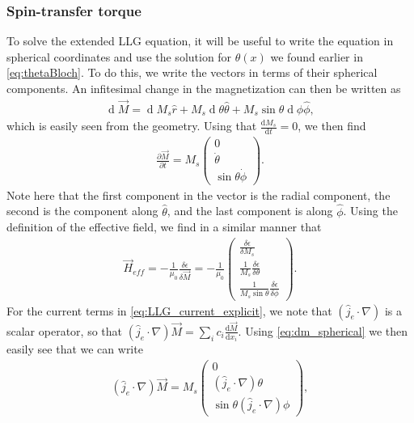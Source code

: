 \documentclass[12pt, a4paper, twoside, openright]{article}		%
\renewcommand{\d}[1]{\ensuremath{\operatorname{d}\!{#1}}}
\numberwithin{equation}{section}
\begin{document}
\subsubsection{Spin-transfer torque}
To solve the extended LLG equation, it will be useful to write the equation in spherical coordinates and use the solution for $\theta(x)$ we found earlier in \eqref{eq:thetaBloch}. To do this, we write the vectors in terms of their spherical components. An infitesimal change in the magnetization can then be written as
\begin{align}
\label{eq:dm_spherical}
\d {\vec{M}} = \d M_s \hat{r} + M_s \d {\theta} \hat{\theta} + M_s\sin\theta\d {\phi} \hat{\phi},
\end{align}
which is easily seen from the geometry. Using that $\frac{\textrm{d} M_s}{\textrm{d} t} = 0$, we then find
\begin{align}
\frac{\partial \vec{M}}{\partial t} = M_s
\begin{pmatrix}
0 \\ 
\dot{\theta} \\ 
\sin\theta\dot{\phi}
\end{pmatrix}.
\end{align}
Note here that the first component in the vector is the radial component, the second is the component along $\hat{\theta}$, and the last component is along $\hat{\phi}$. Using the definition of the effective field, we find in a similar manner that
\begin{align}
\vec{H}_{eff} = -\frac{1}{\mu_0} \frac{\delta \epsilon}{\delta \vec{M}} = -\frac{1}{\mu_0}
\begin{pmatrix}
\frac{\delta \epsilon}{\delta M_s} \\ 
\frac{1}{M_s} \frac{\delta \epsilon}{\delta \theta} \\ 
\frac{1}{M_s\sin\theta} \frac{\delta \epsilon}{\delta \phi}
\end{pmatrix}.
\end{align}
For the current terms in \eqref{eq:LLG_current_explicit}, we note that $(\hat{j}_e\cdot\nabla)$ is a scalar operator, so that $(\hat{j}_e\cdot\nabla)\vec{M} = \sum_i c_i \frac{\textrm{d} \vec{M}}{\textrm{d} x_i}$. Using \eqref{eq:dm_spherical} we then easily see that we can write
\begin{align}
(\hat{j}_e\cdot\nabla)\vec{M} = M_s
\begin{pmatrix}
0 \\ 
(\hat{j}_e\cdot\nabla)\theta \\ 
\sin\theta(\hat{j}_e\cdot\nabla)\phi
\end{pmatrix},
\end{align}
\end{document}
